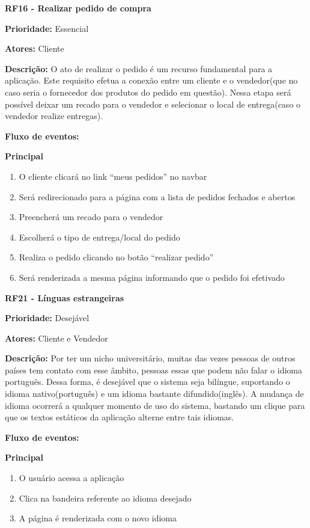 \textbf{RF16 - Realizar pedido de compra} \par
\textbf{Prioridade:} Essencial \par
\textbf{Atores:} Cliente \par
\textbf{Descrição:} O ato de realizar o pedido é um recurso fundamental para a aplicação. Este requisito efetua a conexão entre um cliente e o vendedor(que no caso seria o fornecedor dos produtos do pedido em questão). Nessa etapa será possível deixar um recado para o vendedor e selecionar o local de entrega(caso o vendedor realize entregas). \par
\textbf{Fluxo de eventos:} \par
\textbf{Principal} \par
\begin{enumerate}
  \item O cliente clicará no link “meus pedidos” no navbar
  \item Será redirecionado para a página com a lista de pedidos fechados e abertos
  \item Preencherá um recado para o vendedor
  \item Escolherá o tipo de entrega/local do pedido
  \item Realiza o pedido clicando no botão “realizar pedido”
  \item Será renderizada a mesma página informando que o pedido foi efetivado
\end{enumerate}

\textbf{RF21 - Línguas estrangeiras} \par
\textbf{Prioridade:} Desejável \par
\textbf{Atores:} Cliente e Vendedor \par
\textbf{Descrição:} Por ter um nicho universitário, muitas das vezes pessoas de outros países tem contato com esse âmbito, pessoas essas que podem não falar o idioma português. Dessa forma, é desejável que o sistema seja bilíngue, suportando o idioma nativo(português) e um idioma bastante difundido(inglês). A mudança de idioma ocorrerá a qualquer momento de uso do sistema, bastando um clique para que os textos estáticos da aplicação alterne entre tais idiomas. \par
\textbf{Fluxo de eventos:} \par
\textbf{Principal} \par
\begin{enumerate}
  \item O usuário acessa a aplicação
  \item Clica na bandeira referente ao idioma desejado
  \item A página é renderizada com o novo idioma
\end{enumerate}

